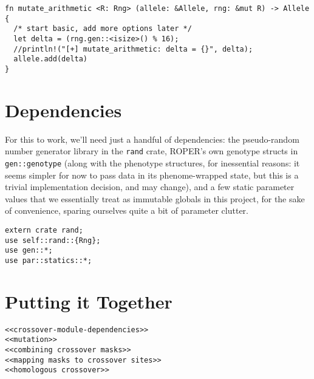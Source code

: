 \documentclass[11pt]{article}
\begin{document}
\lstset{language=rust,label=orgb4967bb,caption= ,captionpos=b,numbers=none}
\begin{lstlisting}
fn mutate_arithmetic <R: Rng> (allele: &Allele, rng: &mut R) -> Allele {
  /* start basic, add more options later */
  let delta = (rng.gen::<isize>() % 16);
  //println!("[+] mutate_arithmetic: delta = {}", delta);
  allele.add(delta)
}
\end{lstlisting}

\section{Dependencies}
\label{sec:orgb43e281}

For this to work, we'll need just a handful of dependencies: the pseudo-random
number generator library in the \texttt{rand} crate, ROPER's own genotype structs in
\texttt{gen::genotype} (along with the phenotype structures, for inessential reasons:
it seems simpler for now to pass data in its phenome-wrapped state, but this is
a trivial implementation decision, and may change), and a few static parameter
values that we essentially treat as immutable globals in this project, for
the sake of convenience, sparing ourselves quite a bit of parameter clutter.

\lstset{language=rust,label=orgc601405,caption= ,captionpos=b,numbers=none}
\begin{lstlisting}
extern crate rand;
use self::rand::{Rng};
use gen::*;
use par::statics::*;
\end{lstlisting}


\section{Putting it Together}
\label{sec:orgd703bec}
\lstset{language=rust,label=orgf29d463,caption= ,captionpos=b,numbers=none}
\begin{lstlisting}
<<crossover-module-dependencies>>
<<mutation>>
<<combining crossover masks>>
<<mapping masks to crossover sites>>
<<homologous crossover>>
\end{lstlisting}
\end{document}
